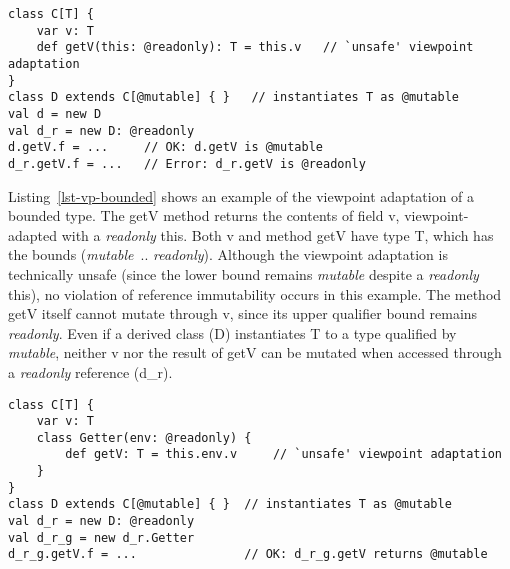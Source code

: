 
\begin{lstlisting}[caption={Viewpoint Adaptation of Bounded Types},float={htp},label={lst-vp-bounded}]
class C[T] {
	var v: T
	def getV(this: @readonly): T = this.v   // `unsafe' viewpoint adaptation
}
class D extends C[@mutable] { }   // instantiates T as @mutable
val d = new D
val d_r = new D: @readonly
d.getV.f = ...     // OK: d.getV is @mutable
d_r.getV.f = ...   // Error: d_r.getV is @readonly
\end{lstlisting}

Listing~\ref{lst-vp-bounded} shows an example of the viewpoint adaptation of
a bounded type. The {\cd getV} method returns the contents of field {\cd v},
viewpoint-adapted with a {\em readonly} {\cd this}.
Both {\cd v} and method {\cd getV} have type {\cd T}, which has the bounds
({\em mutable}~.. {\em readonly}).
Although the viewpoint adaptation is technically unsafe (since the lower bound
remains {\em mutable} despite a {\em readonly} {\cd this}),
no violation of reference immutability occurs in this example.
The method {\cd getV} itself cannot mutate through {\cd v}, since
its upper qualifier bound remains {\em readonly}.
Even if a derived class ({\cd D}) instantiates {\cd T} to a type
qualified by {\em mutable}, neither {\cd v} nor the result of {\cd getV}
can be mutated when accessed through a {\em readonly} reference ({\cd d\_r}).

\begin{lstlisting}[caption={Bounded Types and the Getter Class},float={htp},label={lst-vp-bounded-2}]
class C[T] {
	var v: T
	class Getter(env: @readonly) {
		def getV: T = this.env.v     // `unsafe' viewpoint adaptation
	}
}
class D extends C[@mutable] { }  // instantiates T as @mutable
val d_r = new D: @readonly
val d_r_g = new d_r.Getter
d_r_g.getV.f = ...               // OK: d_r_g.getV returns @mutable
\end{lstlisting}

